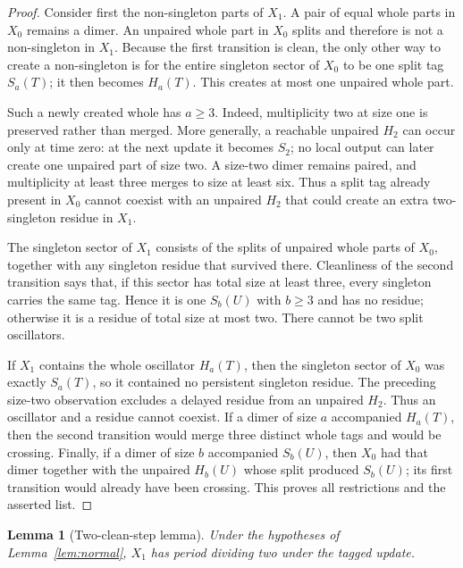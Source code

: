 \documentclass[10pt,a4paper]{amsart}
\newtheorem{lemma}[theorem]{Lemma}
\theoremstyle{definition}
\theoremstyle{remark}
\begin{document}
\begin{proof}
Consider first the non-singleton parts of $X_1$.  A pair of equal whole
parts in $X_0$ remains a dimer.  An unpaired whole part in $X_0$ splits and
therefore is not a non-singleton in $X_1$.  Because the first transition is
clean, the only other way to create a non-singleton is for the entire
singleton sector of $X_0$ to be one split tag $S_a(T)$; it then becomes
$H_a(T)$.  This creates at most one unpaired whole part.

Such a newly created whole has $a\geq3$.  Indeed, multiplicity two at size
one is preserved rather than merged.  More generally, a reachable unpaired
$H_2$ can occur only at time zero: at the next update it becomes $S_2$;
no local output can later create one unpaired part of size two.  A size-two
dimer remains paired, and multiplicity at least three merges to size at
least six.  Thus a split tag already present in $X_0$ cannot coexist with an
unpaired $H_2$ that could create an extra two-singleton residue in $X_1$.

The singleton sector of $X_1$ consists of the splits of unpaired whole
parts of $X_0$, together with any singleton residue that survived there.
Cleanliness of the second transition says that, if this sector has total
size at least three, every singleton carries the same tag.  Hence it is one
$S_b(U)$ with $b\geq3$ and has no residue; otherwise it is a residue of
total size at most two.  There cannot be two split oscillators.

If $X_1$ contains the whole oscillator $H_a(T)$, then the singleton sector
of $X_0$ was exactly $S_a(T)$, so it contained no persistent singleton
residue.  The preceding size-two observation excludes a delayed residue
from an unpaired $H_2$.  Thus an oscillator and a residue cannot coexist.
If a dimer of size $a$ accompanied $H_a(T)$, then the second transition
would merge three distinct whole tags and would be crossing.  Finally, if a
dimer of size $b$ accompanied $S_b(U)$, then $X_0$ had that dimer together
with the unpaired $H_b(U)$ whose split produced $S_b(U)$; its first
transition would already have been crossing.  This proves all restrictions
and the asserted list.
\end{proof}

\begin{lemma}[Two-clean-step lemma]\label{lem:two-clean}
Under the hypotheses of Lemma~\ref{lem:normal}, $X_1$ has period dividing
two under the tagged update.
\end{lemma}
\end{document}
